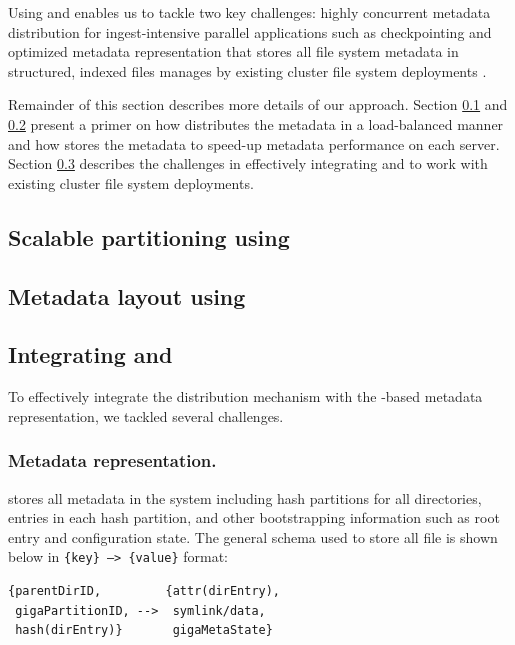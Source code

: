 Using \giga{} and \ldb{} enables us to tackle two key challenges: highly 
concurrent metadata distribution for ingest-intensive parallel applications
such as checkpointing \cite{PLFS} and 
optimized metadata representation that stores all file system
metadata in structured, indexed files manages by existing cluster file system
deployments \cite{LevelDB}. 

Remainder of this section describes more details of our approach. 
Section \ref{design.giga} and \ref{design.tablefs} present a primer on how
\giga{} distributes the metadata in a load-balanced manner and how \ldb{}
stores the metadata to speed-up metadata performance on each server. 
Section \ref{design.integration} describes the challenges in effectively
integrating \giga{} and \ldb{} to work with existing cluster file system
deployments. 

\subsection{Scalable partitioning using \giga{}}
\label{design.giga}


\subsection{Metadata layout using \ldb{}}
\label{design.tablefs}


\subsection{Integrating \giga{} and \ldb{}}
\label{design.integration}

To effectively integrate the \giga{} distribution mechanism with the
\ldb{}-based metadata representation, we tackled several challenges. 

\subsubsection*{Metadata representation.}

\ldb{} stores all metadata in the system including \giga{} hash
partitions for all directories, entries in each hash partition, and other
bootstrapping information such as root entry and \giga{} configuration state.
The general schema used to store all file is shown below in
\texttt{\{key\} --> \{value\}} format:

\begin{verbatim}
{parentDirID,         {attr(dirEntry),
 gigaPartitionID, -->  symlink/data,
 hash(dirEntry)}       gigaMetaState}
\end{verbatim}

